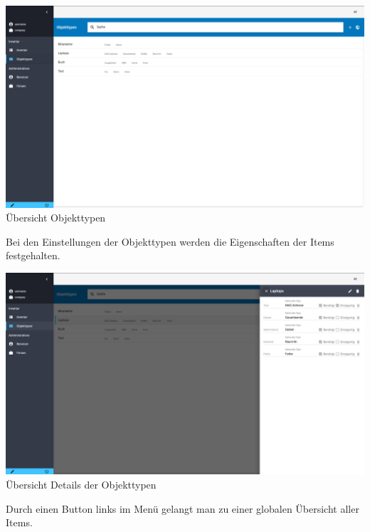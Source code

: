 \documentclass[11pt,a4paper]{report}
\begin{document}
	\begin{center}
		\includegraphics[scale=0.3]{Objekttypen.png}
		\\Übersicht Objekttypen\\
	\end{center}
	
		Bei den Einstellungen der Objekttypen werden die Eigenschaften der Items festgehalten. \\
		
	\begin{center}
		\includegraphics[scale=0.3]{Objekttypen-Eigenschaften.png}
		\\Übersicht Details der Objekttypen\\
	\end{center}
	
	Durch einen Button links im Menü gelangt man zu einer globalen Übersicht aller Items.\\
		
\end{document}
